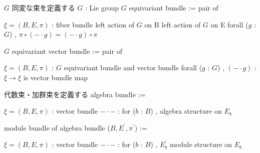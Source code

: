 \begin{Definition}
\itemnote \(G\) 同変な束を定義する
\itemwhen \(G\) : Lie group
\itemdefi
  \(G\) equivariant bundle := pair of
  \begin{itemize}
    \itemenum \(\xi = (B , E , \pi)\) : fiber bundle
    \itemenum left action of \(G\) on B
    \itemenum left action of \(G\) on E
    \itemwith forall (\(g\) : \(G\)) , \(\pi \circ (- \cdot g) = (- \cdot g) \circ \pi\)
  \end{itemize}
\itemdefi
  \(G\) equivariant vector bundle := pair of
  \begin{itemize}
    \itemenum \(\xi = (B , E , \pi)\) : \(G\) equivariant bundle and vector bundle
    \itemwith
      forall (\(g\) : \(G\)) , \((- \cdot g)\) : \(\xi \to \xi\) is vector bundle map
  \end{itemize}
\end{Definition}

\begin{Definition}
\itemnote 代数束・加群束を定義する
\itemdefi 
  algebra bundle :=
  \begin{itemize}
    \itemenum \(\xi = (B , E , \pi)\) : vector bundle
    \itemenum \(- \cdot -\) :
      for (\(b\) : \(B\)) , algebra structure on \(E_b\)
    \itemwith {}
  \end{itemize}
  module bundle of algebra bundle (\(B , E^{\prime} , \pi^{\prime}\)) :=
  \begin{itemize}
    \itemenum \(\xi = (B , E , \pi)\) : vector bundle
    \itemenum \(- \cdot -\) :
      for (\(b\) : \(B\)) , \(E^{\prime}_b\) module structure on \(E_b\) 
    \itemwith {}
  \end{itemize}
\end{Definition}